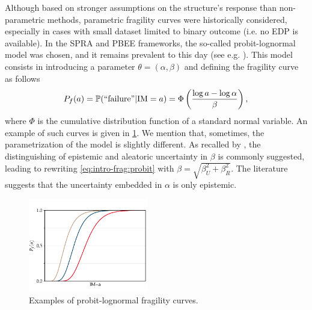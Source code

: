 Although based on stronger assumptions on the structure's response than non-parametric methods, parametric fragility curves were historically considered, especially in cases with small dataset limited to binary outcome (i.e. no EDP is available).
In the SPRA and PBEE frameworks, the so-called probit-lognormal model was chosen, and it remains prevalent to this day (see e.g. \cite{shinozuka_statistical_2000,straub_improved_2008,zentner_numerical_2010,wang_influence_2020,mandal_seismic_2016,zhao_seismic_2020,ellingwood_earthquake_2001,kim_development_2004,mai_seismic_2017,trevlopoulos_parametric_2019,katayama_bayesian-estimation-based_2021,lee_efficient_2023}).
This model consists in introducing a parameter $\theta=(\alpha,\beta)$ and defining the fragility curve as follows
    \begin{equation}\label{eq:intro-frag:probit}
        P_f(a) = \mathbb{P}(\text{``failure''}|\text{IM}=a) = \Phi\left( \frac{\log a-\log\alpha}{\beta} \right),
    \end{equation}
where $\Phi$ is the cumulative distribution function of a standard normal variable. An example of such curves is given in \cref{fig:intro-frags:exfrags}.
We mention that, sometimes, the parametrization of the model is slightly different. As recalled by \cite{zentner_fragility_2017}, the distinguishing of epistemic and aleatoric uncertainty in $\beta$ is commonly suggested, leading to rewriting \cref{eq:intro-frag:probit} with $\beta=\sqrt{\beta^2_U+\beta^2_R}$. 
The literature suggests that the uncertainty embedded in $\alpha$ is only epistemic.

\begin{figure}[h]
    \centering
    \includegraphics[width=5.225cm]{figures/intro-frags/exfrags.pdf}
    \caption{Examples of probit-lognormal fragility curves.}
    \label{fig:intro-frags:exfrags}
\end{figure}



